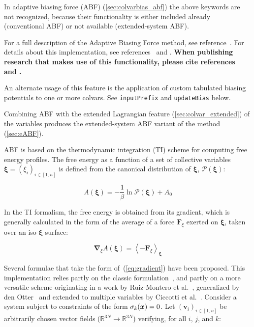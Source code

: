 In adaptive biasing force (ABF) (\ref{sec:colvarbias_abf}) the above keywords are not recognized, because their functionality is either included already (conventional ABF) or not available (extended-system ABF).




For a full description of the Adaptive Biasing Force method, see
reference~\cite{Darve2008}. For details about this implementation,
see references~\cite{Henin2004} and \cite{Henin2010}. \textbf{When
publishing research that makes use of this functionality, please cite
references~\cite{Darve2008} and \cite{Henin2010}.}

An alternate usage of this feature is the application of custom
tabulated biasing potentials to one or more colvars. See
\texttt{inputPrefix} and \texttt{updateBias} below.

Combining ABF with the extended Lagrangian feature (\ref{sec:colvar_extended})
of the variables produces the extended-system ABF variant of the method
(\ref{sec:eABF}).

ABF is based on the thermodynamic integration (TI) scheme for
computing free energy profiles. The free energy as a function
of a set of collective variables $\bm{\xi}=(\xi_{i})_{i\in[1,n]}$
is defined from the canonical distribution of $\bm{\xi}$, ${\mathcal P}(\bm{\xi})$:

\begin{equation}
  \label{eq:free}
  A(\bm{\xi}) = -\frac{1}{\beta} \ln {\mathcal P}(\bm{\xi}) + A_0
\end{equation}

In the TI formalism, the free energy is obtained from its gradient,
which is generally calculated in the form of the average of a force
$\bm{F}_\xi$ exerted on $\bm{\xi}$, taken over an iso-$\bm{\xi}$ surface:

\begin{equation}
  \label{eq:gradient}
  \bm{\nabla}_\xi A(\bm{\xi}) = \left\langle -\bm{F}_\xi \right\rangle_{\bm{\xi}}
\end{equation}

Several formulae that take the form of~(\ref{eq:gradient}) have been
proposed.  This implementation relies partly on the classic
formulation~\cite{Carter1989}, and partly on a more versatile scheme
originating in a work by Ruiz-Montero et al.~\cite{Ruiz-Montero1997},
generalized by den Otter~\cite{denOtter2000} and extended to multiple
variables by Ciccotti et al.~\cite{Ciccotti2005}.  Consider a system
subject to constraints of the form $\sigma_{k}({\mbox{\boldmath{$x$}}}) = 0$.  Let
$(\bm{v}_{i})_{i\in[1,n]}$ be arbitrarily chosen vector fields
($\mathbb{R}^{3N}\rightarrow\mathbb{R}^{3N}$) verifying, for all $i$,
$j$, and $k$:

